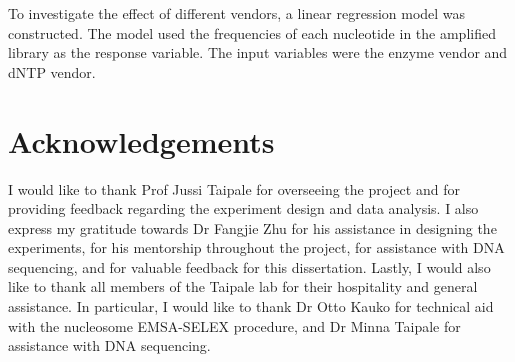 \documentclass[a4paper, numbers=noenddot]{scrbook}
\begin{document}
To investigate the effect of different vendors, a linear regression model was constructed.  The model used the frequencies of each nucleotide in the amplified library as the response variable.  The input variables were the enzyme vendor and dNTP vendor.

\backmatter

\chapter{Acknowledgements}
\label{ch:ack}

I would like to thank Prof Jussi Taipale for overseeing the project and for providing feedback regarding the experiment design and data analysis.  I also express my gratitude towards Dr Fangjie Zhu for his assistance in designing the experiments, for his mentorship throughout the project, for assistance with DNA sequencing, and for valuable feedback for this dissertation.  Lastly, I would also like to thank all members of the Taipale lab for their hospitality and general assistance.  In particular, I would like to thank Dr Otto Kauko for technical aid with the nucleosome EMSA-SELEX procedure, and Dr Minna Taipale for assistance with DNA sequencing.

{\printbibliography[title={References}]}
\end{document}
